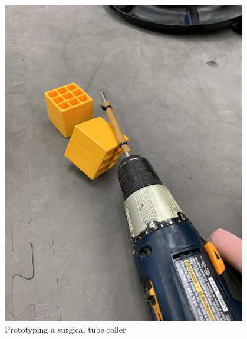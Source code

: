 \begin{figure}[ht]
\begin{minipage}[b]{.48\textwidth}
  \includegraphics[width=0.95\textwidth]{Meetings/November/11-17-21/11-17-21_Hardware_Figure2 - Nathan Forrer.JPG}
  \caption{Prototyping a surgical tube roller}
  \label{fig:pic2}
\end{minipage}
\end{figure}



